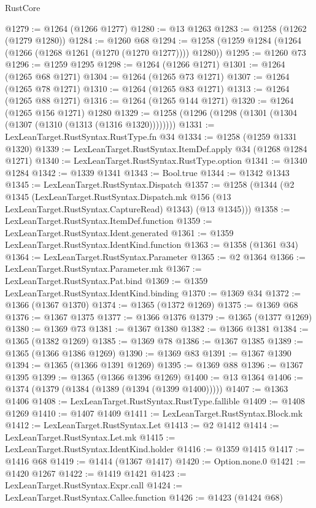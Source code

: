 \begin{lexlean}{RustCore}
\begin{coremodule}
@1279 := @1264 (@1266 @1277)
@1280 := @13 @1263
@1283 := @1258 (@1262 (@1279 @1280))
@1284 := @1260 @68
@1294 := @1258 (@1259 @1284 (@1264 (@1266 (@1268 @1261 (@1270 (@1270 @1277)))) @1280))
@1295 := @1260 @73
@1296 := @1259 @1295
@1298 := @1264 (@1266 @1271)
@1301 := @1264 (@1265 @68 @1271)
@1304 := @1264 (@1265 @73 @1271)
@1307 := @1264 (@1265 @78 @1271)
@1310 := @1264 (@1265 @83 @1271)
@1313 := @1264 (@1265 @88 @1271)
@1316 := @1264 (@1265 @144 @1271)
@1320 := @1264 (@1265 @156 @1271) @1280
@1329 := @1258 (@1296 (@1298 (@1301 (@1304 (@1307 (@1310 (@1313 (@1316 @1320))))))))
@1331 := LexLeanTarget.RustSyntax.RustType.fn @34
@1334 := @1258 (@1259 @1331 @1320)
@1339 := LexLeanTarget.RustSyntax.ItemDef.apply @34 (@1268 @1284 @1271)
@1340 := LexLeanTarget.RustSyntax.RustType.option
@1341 := @1340 @1284
@1342 := @1339 @1341
@1343 := Bool.true
@1344 := @1342 @1343
@1345 := LexLeanTarget.RustSyntax.Dispatch
@1357 := @1258
    (@1344
      (@2
        @1345
        (LexLeanTarget.RustSyntax.Dispatch.mk @156 (@13 LexLeanTarget.RustSyntax.CaptureRead) @1343)
        (@13 @1345)))
@1358 := LexLeanTarget.RustSyntax.ItemDef.function
@1359 := LexLeanTarget.RustSyntax.Ident.generated
@1361 := @1359 LexLeanTarget.RustSyntax.IdentKind.function
@1363 := @1358 (@1361 @34)
@1364 := LexLeanTarget.RustSyntax.Parameter
@1365 := @2 @1364
@1366 := LexLeanTarget.RustSyntax.Parameter.mk
@1367 := LexLeanTarget.RustSyntax.Pat.bind
@1369 := @1359 LexLeanTarget.RustSyntax.IdentKind.binding
@1370 := @1369 @34
@1372 := @1366 (@1367 @1370)
@1374 := @1365 (@1372 @1269)
@1375 := @1369 @68
@1376 := @1367 @1375
@1377 := @1366 @1376
@1379 := @1365 (@1377 @1269)
@1380 := @1369 @73
@1381 := @1367 @1380
@1382 := @1366 @1381
@1384 := @1365 (@1382 @1269)
@1385 := @1369 @78
@1386 := @1367 @1385
@1389 := @1365 (@1366 @1386 @1269)
@1390 := @1369 @83
@1391 := @1367 @1390
@1394 := @1365 (@1366 @1391 @1269)
@1395 := @1369 @88
@1396 := @1367 @1395
@1399 := @1365 (@1366 @1396 @1269)
@1400 := @13 @1364
@1406 := @1374 (@1379 (@1384 (@1389 (@1394 (@1399 @1400)))))
@1407 := @1363 @1406
@1408 := LexLeanTarget.RustSyntax.RustType.fallible
@1409 := @1408 @1269
@1410 := @1407 @1409
@1411 := LexLeanTarget.RustSyntax.Block.mk
@1412 := LexLeanTarget.RustSyntax.Let
@1413 := @2 @1412
@1414 := LexLeanTarget.RustSyntax.Let.mk
@1415 := LexLeanTarget.RustSyntax.IdentKind.holder
@1416 := @1359 @1415
@1417 := @1416 @68
@1419 := @1414 (@1367 @1417)
@1420 := Option.none.{0}
@1421 := @1420 @1267
@1422 := @1419 @1421
@1423 := LexLeanTarget.RustSyntax.Expr.call
@1424 := LexLeanTarget.RustSyntax.Callee.function
@1426 := @1423 (@1424 @68)

\end{coremodule}
\end{lexlean}
